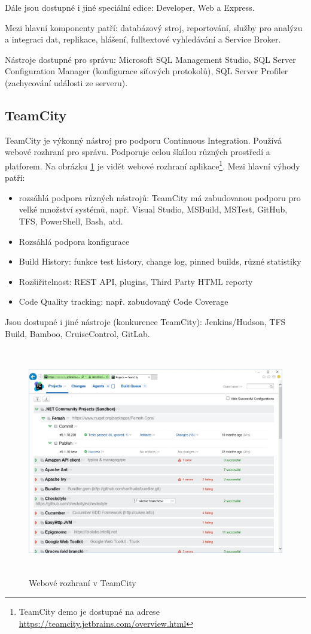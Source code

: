Dále jsou dostupné i jiné speciální edice: Developer, Web a Express.

Mezi hlavní komponenty patří: databázový stroj, reportování, služby pro analýzu a integraci dat, replikace, hlášení, fulltextové vyhledávání a Service Broker.

Nástroje dostupné pro správu: Microsoft SQL Management Studio, SQL Server Configuration Manager (konfigurace síťových protokolů), SQL Server Profiler (zachycování události ze serveru).  \cite{SqlServerIntro}

\subsection{TeamCity}
TeamCity je výkonný nástroj pro podporu Continuous Integration. Používá webové rozhraní pro správu. Podporuje celou škálou různých prostředí a platforem. Na obrázku \ref{fig:teamcityoverview} je vidět webové rozhraní aplikace\footnote{TeamCity demo je dostupné na adrese \url{https://teamcity.jetbrains.com/overview.html}}. Mezi hlavní výhody patří: 

\begin{itemize}
\item rozsáhlá podpora různých nástrojů: TeamCity má zabudovanou podporu pro velké množství systémů, např. Visual Studio, MSBuild, MSTest, GitHub, TFS, PowerShell, Bash, atd.
\item Rozsáhlá podpora konfigurace
\item Build History: funkce test history, change log, pinned builds, různé statistiky
\item Rozšiřitelnost: REST API, plugins, Third Party HTML reporty
\item Code Quality tracking: např. zabudovaný Code Coverage
\end{itemize}

Jsou dostupné i jiné nástroje (konkurence TeamCity): Jenkins/Hudson, TFS Build, Bamboo, CruiseControl, GitLab. \cite{TeamCity}

\begin{figure}[]
  \centering
  \includegraphics[height=10cm]{fig/teamcity_overview.jpg}
  \caption{Webové rozhraní v TeamCity}
  \label{fig:teamcityoverview}
\end{figure}

